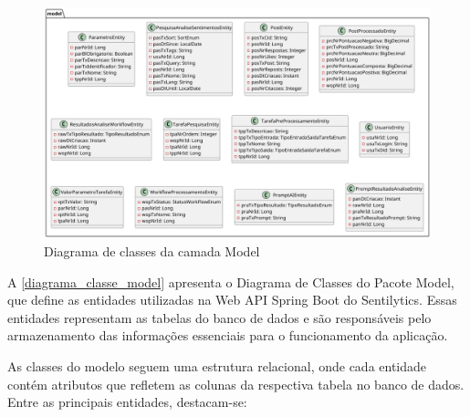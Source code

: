 \documentclass[
	12pt,				%
	oneside,			%
	a4paper,			%
	english,			%
	french,				%
	spanish,			%
	brazil				%
	]{abntex2}
\begin{document}
\begin{figure}[htbp]
\hypertarget{diagrama_classe_model}{%
\caption{Diagrama de classes da camada Model}\label{diagrama_classe_model}
\begin{center}
\includegraphics[scale=0.3]{imagens/sentilytics/diagramas/classes/model-classes.png}
\end{center}
}
\end{figure}

A \autoref{diagrama_classe_model} apresenta o Diagrama de Classes do
Pacote Model, que define as entidades utilizadas na Web API Spring Boot
do Sentilytics. Essas entidades representam as tabelas do banco de dados
e são responsáveis pelo armazenamento das informações essenciais para o
funcionamento da aplicação.

As classes do modelo seguem uma estrutura relacional, onde cada entidade
contém atributos que refletem as colunas da respectiva tabela no banco
de dados. Entre as principais entidades, destacam-se:
\end{document}
